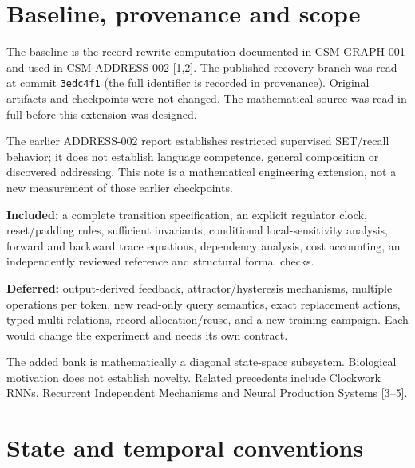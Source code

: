 \documentclass[11pt,a4paper]{article}
\begin{document}
\newpage
\tableofcontents
\newpage

\section{Baseline, provenance and scope}

The baseline is the record-rewrite computation documented in CSM-GRAPH-001 and
used in CSM-ADDRESS-002 [1,2]. The published recovery branch was read at commit
\texttt{3edc4f1} (the full identifier is recorded in provenance). Original artifacts and
checkpoints were not changed. The mathematical source was read in full before
this extension was designed.

The earlier ADDRESS-002 report establishes restricted supervised SET/recall
behavior; it does not establish language competence, general composition or
discovered addressing. This note is a mathematical engineering extension, not a
new measurement of those earlier checkpoints.

\textbf{Included:} a complete transition specification, an explicit regulator
clock, reset/padding rules, sufficient invariants, conditional local-sensitivity
analysis, forward and backward trace equations, dependency analysis, cost
accounting, an independently reviewed reference and structural formal checks.

\textbf{Deferred:} output-derived feedback, attractor/hysteresis mechanisms,
multiple operations per token, new read-only query semantics, exact replacement
actions, typed multi-relations, record allocation/reuse, and a new training
campaign. Each would change the experiment and needs its own contract.

The added bank is mathematically a diagonal state-space subsystem. Biological
motivation does not establish novelty. Related precedents include Clockwork
RNNs, Recurrent Independent Mechanisms and Neural Production Systems [3--5].

\section{State and temporal conventions}
\end{document}
